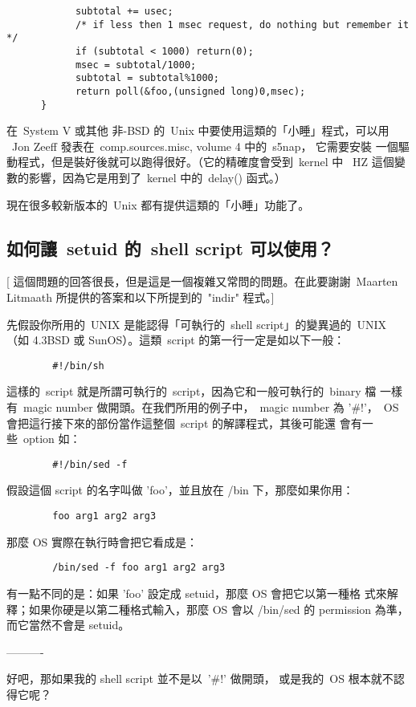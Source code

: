 \documentclass{article}
\begin{document}
\begin{CJK*}{Bg5}{ming}
\begin{verbatim}
            subtotal += usec;
            /* if less then 1 msec request, do nothing but remember it */
            if (subtotal < 1000) return(0);
            msec = subtotal/1000;
            subtotal = subtotal%1000;
            return poll(&foo,(unsigned long)0,msec);
      }
\end{verbatim}
\normalsize
	在~System V 或其他 非-BSD 的~Unix 中要使用這類的「小睡」程式，可以用 
       ~Jon Zeeff 發表在~comp.sources.misc, volume 4 中的~s5nap， 它需要安裝
	一個驅動程式，但是裝好後就可以跑得很好。（它的精確度會受到~kernel 中 
	~HZ 這個變數的影響，因為它是用到了~kernel 中的~delay() 函式。）

	現在很多較新版本的~Unix 都有提供這類的「小睡」功能了。

\subsection{如何讓~setuid 的~shell script 可以使用？}

	[ 這個問題的回答很長，但是這是一個複雜又常問的問題。在此要謝謝~Maarten 
	Litmaath 所提供的答案和以下所提到的~"indir" 程式。]

	先假設你所用的~UNIX 是能認得「可執行的~shell script」的變異過的~UNIX
       （如 4.3BSD 或 SunOS）。這類~script 的第一行一定是如以下一般：
\begin{verbatim}
		#!/bin/sh
\end{verbatim}
	這樣的~script 就是所謂可執行的~script，因為它和一般可執行的~binary 檔
        一樣有~magic number 做開頭。在我們所用的例子中，~magic number 為 
        '\#!'，~OS 會把這行接下來的部份當作這整個~script 的解譯程式，其後可能還
        會有一些~option 如：
\begin{verbatim}
		#!/bin/sed -f
\end{verbatim}
	假設這個 script 的名字叫做 'foo'，並且放在 /bin 下，那麼如果你用：
\begin{verbatim}
		foo arg1 arg2 arg3
\end{verbatim}
	那麼 OS 實際在執行時會把它看成是：
\begin{verbatim}
		/bin/sed -f foo arg1 arg2 arg3
\end{verbatim}
	有一點不同的是：如果 'foo' 設定成 setuid，那麼 OS 會把它以第一種格
        式來解釋；如果你硬是以第二種格式輸入，那麼 OS 會以 /bin/sed 的 
        permission 為準，而它當然不會是 setuid。

        ----------

	好吧，那如果我的 shell script 並不是以~'\#!' 做開頭，
	或是我的~OS 根本就不認得它呢？


\end{CJK*}
\end{document}
